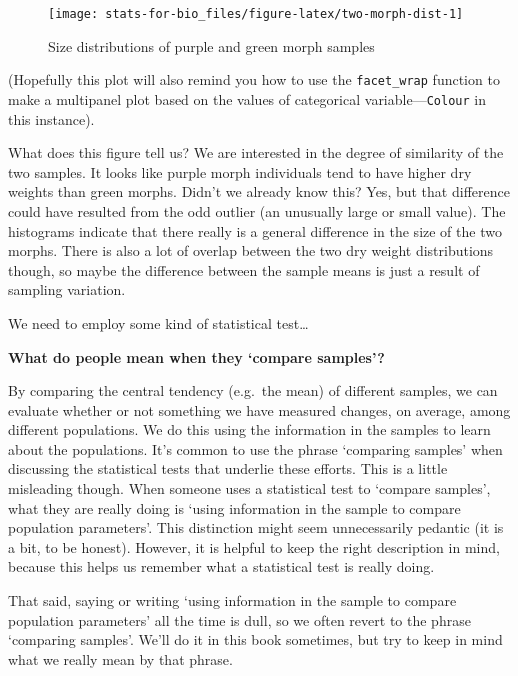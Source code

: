 \documentclass[]{book}
\begin{document}
\begin{figure}

{\centering \texttt{[image: stats-for-bio\_files/figure-latex/two-morph-dist-1]} 

}

\caption{Size distributions of purple and green morph samples}\label{fig:two-morph-dist}
\end{figure}

(Hopefully this plot will also remind you how to use the
\texttt{facet\_wrap} function to make a multipanel plot based on the
values of categorical variable---\texttt{Colour} in this instance).

What does this figure tell us? We are interested in the degree of
similarity of the two samples. It looks like purple morph individuals
tend to have higher dry weights than green morphs. Didn't we already
know this? Yes, but that difference could have resulted from the odd
outlier (an unusually large or small value). The histograms indicate
that there really is a general difference in the size of the two morphs.
There is also a lot of overlap between the two dry weight distributions
though, so maybe the difference between the sample means is just a
result of sampling variation.

We need to employ some kind of statistical test\ldots{}

\begin{advanced-box}
\textbf{What do people mean when they `compare samples'?}

By comparing the central tendency (e.g.~the mean) of different samples,
we can evaluate whether or not something we have measured changes, on
average, among different populations. We do this using the information
in the samples to learn about the populations. It's common to use the
phrase `comparing samples' when discussing the statistical tests that
underlie these efforts. This is a little misleading though. When someone
uses a statistical test to `compare samples', what they are really doing
is `using information in the sample to compare population parameters'.
This distinction might seem unnecessarily pedantic (it is a bit, to be
honest). However, it is helpful to keep the right description in mind,
because this helps us remember what a statistical test is really doing.

That said, saying or writing `using information in the sample to compare
population parameters' all the time is dull, so we often revert to the
phrase `comparing samples'. We'll do it in this book sometimes, but try
to keep in mind what we really mean by that phrase.
\end{advanced-box}
\end{document}
